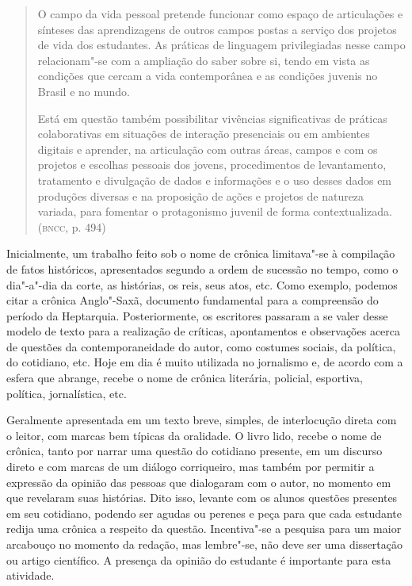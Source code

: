 \documentclass{article}
\begin{document}
\begin{quote}
O campo da vida pessoal pretende funcionar como espaço de articulações
e sínteses das aprendizagens de outros campos postas a serviço dos
projetos de vida dos estudantes. As práticas de linguagem privilegiadas
nesse campo relacionam"-se com a ampliação do saber sobre si, tendo em
vista as condições que cercam a vida contemporânea e as condições
juvenis no Brasil e no mundo.

Está em questão também possibilitar vivências significativas de práticas
colaborativas em situações de interação presenciais ou em ambientes
digitais e aprender, na articulação com outras áreas, campos e com os
projetos e escolhas pessoais dos jovens, procedimentos de levantamento,
tratamento e divulgação de dados e informações e o uso desses dados em
produções diversas e na proposição de ações e projetos de natureza
variada, para fomentar o protagonismo juvenil de forma
contextualizada. (\textsc{bncc}, p. 494)
\end{quote}

Inicialmente, um trabalho feito sob o nome de crônica limitava"-se à
compilação de fatos históricos, apresentados segundo a ordem de
sucessão no tempo, como o dia"-a"-dia da corte, as histórias, os reis,
seus atos, etc. Como exemplo, podemos citar a crônica Anglo"-Saxã,
documento fundamental para a compreensão do período da Heptarquia.
Posteriormente, os escritores passaram a se valer desse modelo de
texto para a realização de críticas, apontamentos e observações acerca
de questões da contemporaneidade do autor, como costumes sociais, da
política, do cotidiano, etc. Hoje em dia é muito utilizada no
jornalismo e, de acordo com a esfera que abrange, recebe o nome de
crônica literária, policial, esportiva, política, jornalística, etc.

Geralmente apresentada em um texto breve, simples, de interlocução
direta com o leitor, com marcas bem típicas da oralidade. O livro lido,
recebe o nome de crônica, tanto por narrar uma questão do cotidiano
presente, em um discurso direto e com marcas de um diálogo corriqueiro,
mas também por permitir a expressão da opinião das pessoas que
dialogaram com o autor, no momento em que revelaram suas histórias. Dito
isso, levante com os alunos questões presentes em seu cotidiano, podendo
ser agudas ou perenes e peça para que cada estudante redija uma crônica
a respeito da questão. Incentiva"-se a pesquisa para um maior arcabouço
no momento da redação, mas lembre"-se, não deve ser uma dissertação ou
artigo científico. A presença da opinião do estudante é importante para
esta atividade.
\end{document}
